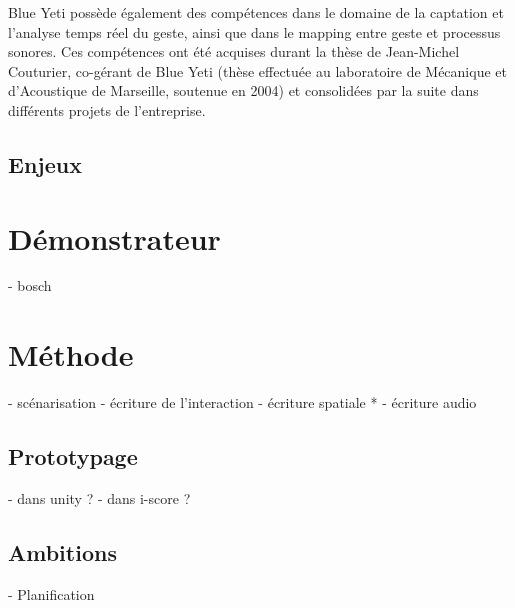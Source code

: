 \documentclass[french]{article}
\begin{document}
    Blue Yeti possède également des compétences dans le domaine de la captation et l’analyse temps 
    réel du geste, ainsi que dans le mapping entre geste et processus sonores. Ces compétences ont 
    été acquises durant la thèse de Jean-Michel Couturier, co-gérant de Blue Yeti (thèse effectuée au 
    laboratoire de Mécanique et d’Acoustique de Marseille, soutenue en 2004) et consolidées par la suite dans différents projets de l’entreprise.
    
    \subsection*{Enjeux}
    
    \section*{Démonstrateur}
    - bosch
    
    \section*{Méthode}
    - scénarisation
    - écriture de l'interaction
    - écriture spatiale
      * 
    - écriture audio
    
    \subsection*{Prototypage}
    - dans unity ? 
    - dans i-score ? 
    
    \subsection*{Ambitions}
    - Planification
\end{document}
